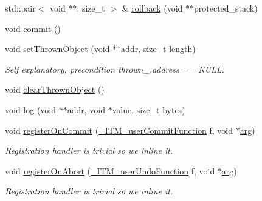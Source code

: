 \begin{DoxyCompactItemize}
\item 
std\-::pair$<$ void $\ast$$\ast$, size\-\_\-t $>$ \& \hyperlink{classitm2stm_1_1Scope_a850c41bcea34d0371b60246cc34e7299}{rollback} (void $\ast$$\ast$protected\-\_\-stack)
\item 
void \hyperlink{classitm2stm_1_1Scope_a8ce7c5d27b9252af8eda2a01f04edd5e}{commit} ()
\item 
void \hyperlink{classitm2stm_1_1Scope_afbc2b2576f638b875816ea0b39344b1e}{set\-Thrown\-Object} (void $\ast$$\ast$addr, size\-\_\-t length)
\begin{DoxyCompactList}\small\item\em Self explanatory, precondition thrown\-\_\-.\-address == N\-U\-L\-L. \end{DoxyCompactList}\item 
void \hyperlink{classitm2stm_1_1Scope_a4b6cc59b6b0c5918cf7e82ce745287d6}{clear\-Thrown\-Object} ()
\item 
void \hyperlink{classitm2stm_1_1Scope_af2e6f7435e470f0e82a13908a2e4113e}{log} (void $\ast$$\ast$addr, void $\ast$value, size\-\_\-t bytes)
\item 
void \hyperlink{classitm2stm_1_1Scope_af4d325f50736edd8194852a467787dc4}{register\-On\-Commit} (\hyperlink{libitm_8h_ac19d9bbf121b4c401cbf3603a681aa0c}{\-\_\-\-I\-T\-M\-\_\-user\-Commit\-Function} f, void $\ast$\hyperlink{structarg}{arg})
\begin{DoxyCompactList}\small\item\em Registration handler is trivial so we inline it. \end{DoxyCompactList}\item 
void \hyperlink{classitm2stm_1_1Scope_a45610a8d68227869b060f4f2f08ca3bf}{register\-On\-Abort} (\hyperlink{libitm_8h_ab839c16357d3c2a1b04f7a286bf476d1}{\-\_\-\-I\-T\-M\-\_\-user\-Undo\-Function} f, void $\ast$\hyperlink{structarg}{arg})
\begin{DoxyCompactList}\small\item\em Registration handler is trivial so we inline it. \end{DoxyCompactList}\end{DoxyCompactItemize}
